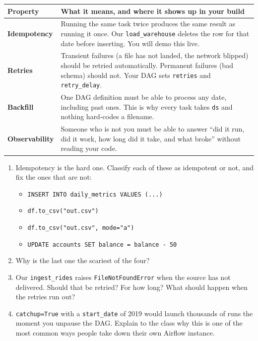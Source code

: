 \documentclass[11pt]{article}
\newcommand{\key}[1]{\textcolor{accent}{\textbf{#1}}}
\begin{document}
\begin{center}
\small
\begin{tabular}{@{}p{}p{}@{}}
\toprule
\textbf{Property} & \textbf{What it means, and where it shows up in your build} \\
\midrule
\key{Idempotency} &
Running the same task twice produces the same result as running it once. Our
\texttt{load\_warehouse} deletes the row for that date before inserting. You
will demo this live. \\
\addlinespace
\key{Retries} &
Transient failures (a file has not landed, the network blipped) should be
retried automatically. Permanent failures (bad schema) should not. Your DAG
sets \texttt{retries} and \texttt{retry\_delay}. \\
\addlinespace
\key{Backfill} &
One DAG definition must be able to process any date, including past ones. This
is why every task takes \texttt{ds} and nothing hard-codes a filename. \\
\addlinespace
\key{Observability} &
Someone who is not you must be able to answer ``did it run, did it work, how
long did it take, and what broke'' without reading your code. \\
\bottomrule
\end{tabular}
\end{center}

\begin{qbox}
\begin{enumerate}
  \item Idempotency is the hard one. Classify each of these as idempotent or
        not, and fix the ones that are not:
        \begin{itemize}
          \item \texttt{INSERT INTO daily\_metrics VALUES (...)}
          \item \texttt{df.to\_csv("out.csv")}
          \item \texttt{df.to\_csv("out.csv", mode="a")}
          \item \texttt{UPDATE accounts SET balance = balance - 50}
        \end{itemize}
  \item Why is the last one the scariest of the four?
  \item Our \texttt{ingest\_rides} raises \texttt{FileNotFoundError} when the
        source has not delivered. Should that be retried? For how long? What
        should happen when the retries run out?
  \item \texttt{catchup=True} with a \texttt{start\_date} of 2019 would launch
        thousands of runs the moment you unpause the DAG. Explain to the class
        why this is one of the most common ways people take down their own
        Airflow instance.
\end{enumerate}
\end{qbox}
\end{document}
